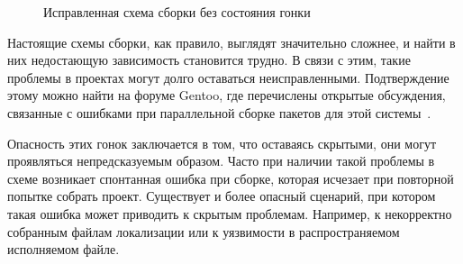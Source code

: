 \begin{figure}[H]
	\centering
    
    \caption{Исправленная схема сборки без состояния гонки}
    \label{fig:project-sample-fix}
\end{figure}

Настоящие схемы сборки, как правило, выглядят значительно сложнее, и найти в них недостающую зависимость становится трудно. В связи с этим, такие проблемы в проектах могут долго оставаться неисправленными. Подтверждение этому можно найти на форуме Gentoo, где перечислены открытые обсуждения, связанные с ошибками при параллельной сборке пакетов для этой системы~\cite{gentoo-bugzilla}.

Опасность этих гонок заключается в том, что оставаясь скрытыми, они могут проявляться непредсказуемым образом. Часто при наличии такой проблемы в схеме возникает спонтанная ошибка при сборке, которая исчезает при повторной попытке собрать проект. Существует и более опасный сценарий, при котором такая ошибка может приводить к скрытым проблемам. Например, к некорректно собранным файлам локализации или к уязвимости в распространяемом исполняемом файле.
